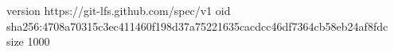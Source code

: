 version https://git-lfs.github.com/spec/v1
oid sha256:4708a70315c3ec411460f198d37a75221635cacdcc46df7364cb58eb24af8fdc
size 1000
